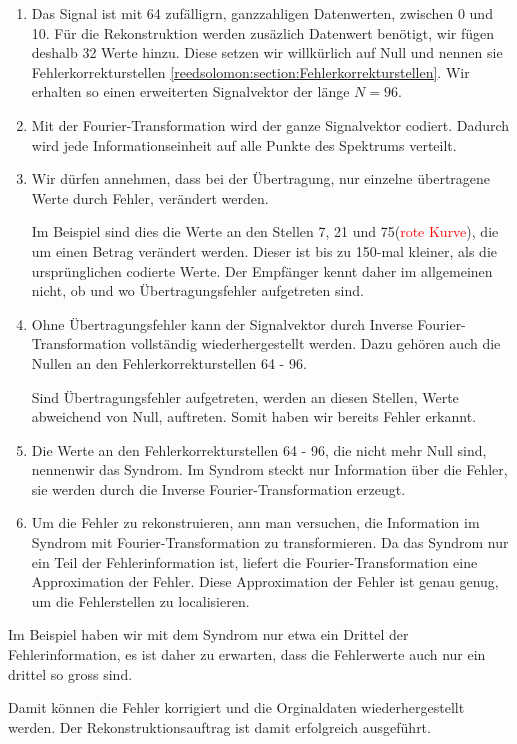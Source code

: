 \begin{enumerate}[(1)]
 \item Das Signal ist mit 64 zufälligrn, ganzzahligen Datenwerten, zwischen 0 und 10.
 Für die Rekonstruktion werden zusäzlich Datenwert benötigt, wir fügen deshalb 32 Werte hinzu.
 Diese setzen wir willkürlich auf Null und nennen sie Fehlerkorrekturstellen
 \ref{reedsolomon:section:Fehlerkorrekturstellen}.
 Wir erhalten so einen erweiterten Signalvektor der länge $N =96$.
 \item Mit der Fourier-Transformation wird der ganze Signalvektor codiert.
 Dadurch wird jede Informationseinheit auf alle Punkte des Spektrums verteilt.
 \item Wir dürfen annehmen, dass bei der Übertragung, nur einzelne übertragene Werte durch Fehler,
 verändert werden.
 \par 
 Im Beispiel sind dies die Werte an den Stellen 7, 21 und 75(\textcolor{red}{rote Kurve}),
 die um einen Betrag verändert werden.
 Dieser ist bis zu 150-mal kleiner, als die ursprünglichen codierte Werte. 
 Der Empfänger kennt daher im allgemeinen nicht, ob und wo Übertragungsfehler aufgetreten sind.
 \item Ohne Übertragungsfehler kann der Signalvektor durch Inverse Fourier-Transformation vollständig
 wiederhergestellt werden.
 Dazu gehören auch die Nullen an den Fehlerkorrekturstellen 64 - 96.
 \par 
 Sind Übertragungsfehler aufgetreten, werden an diesen Stellen, Werte abweichend von Null, auftreten.
 Somit haben wir bereits Fehler erkannt.
 \item Die Werte an den Fehlerkorrekturstellen 64 - 96, die nicht mehr Null sind, nennenwir das Syndrom.
 Im Syndrom steckt nur Information über die Fehler, sie werden durch die Inverse Fourier-Transformation erzeugt.
 \item Um die Fehler zu rekonstruieren, ann man versuchen, die Information im Syndrom mit Fourier-Transformation zu transformieren.
 Da das Syndrom nur ein Teil der Fehlerinformation ist, liefert die Fourier-Transformation eine Approximation der Fehler.
 Diese Approximation der Fehler ist genau genug, um die Fehlerstellen zu localisieren.
\end{enumerate}
Im Beispiel haben wir mit dem Syndrom nur etwa ein Drittel der Fehlerinformation, es ist daher zu erwarten, 
dass die Fehlerwerte auch nur ein drittel so gross sind.
\par 
Damit können die Fehler korrigiert und die Orginaldaten wiederhergestellt werden.
Der Rekonstruktionsauftrag ist damit erfolgreich ausgeführt.


